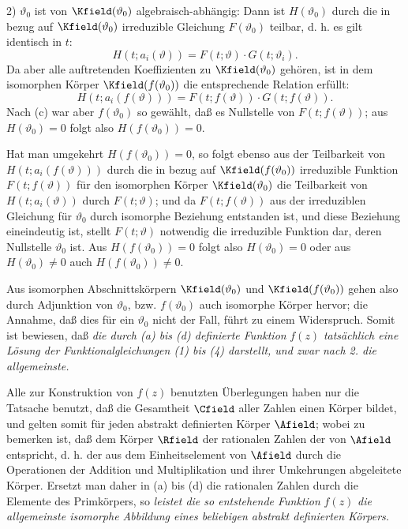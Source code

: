\documentclass[11pt]{article}
\begin{document}
2) \(\vartheta_0\) ist von \(\Kfield(\vartheta_0)\) algebraisch-abhängig: Dann ist \(H(\vartheta_0)\) durch die in bezug auf \(\Kfield(\vartheta_0)\) irreduzible Gleichung \(F(\vartheta_0)\) teilbar, d. h. es gilt identisch in \(t\):
\[
H(t;a_i(\vartheta))=F(t;\vartheta)\cdot G(t;\vartheta_i).
\]
Da aber alle auftretenden Koeffizienten zu \(\Kfield(\vartheta_0)\) gehören, ist in dem isomorphen Körper \(\Kfield(f(\vartheta_0))\) die entsprechende Relation erfüllt:
\[
H(t;a_i(f(\vartheta)))=F(t;f(\vartheta))\cdot G(t;f(\vartheta)).
\]
Nach (c) war aber \(f(\vartheta_0)\) so gewählt, daß es Nullstelle von \(F(t;f(\vartheta))\); aus \(H(\vartheta_0)=0\) folgt also \(H(f(\vartheta_0))=0\).

Hat man umgekehrt \(H(f(\vartheta_0))=0\), so folgt ebenso aus der Teilbarkeit von \(H(t;a_i(f(\vartheta)))\) durch die in bezug auf \(\Kfield(f(\vartheta_0))\) irreduzible Funktion \(F(t;f(\vartheta))\) für den isomorphen Körper \(\Kfield(\vartheta_0)\) die Teilbarkeit von \(H(t;a_i(\vartheta))\) durch \(F(t;\vartheta)\); und da \(F(t;f(\vartheta))\) aus der irreduziblen Gleichung für \(\vartheta_0\) durch isomorphe Beziehung entstanden ist, und diese Beziehung eineindeutig ist, stellt \(F(t;\vartheta)\) notwendig die irreduzible Funktion dar, deren Nullstelle \(\vartheta_0\) ist. Aus \(H(f(\vartheta_0))=0\) folgt also \(H(\vartheta_0)=0\) oder aus \(H(\vartheta_0)\ne0\) auch \(H(f(\vartheta_0))\ne0\).

Aus isomorphen Abschnittskörpern \(\Kfield(\vartheta_0)\) und \(\Kfield(f(\vartheta_0))\) gehen also durch Adjunktion von \(\vartheta_0\), bzw. \(f(\vartheta_0)\) auch isomorphe Körper hervor; die Annahme, daß dies für ein \(\vartheta_0\) nicht der Fall, führt zu einem Widerspruch. Somit ist bewiesen, daß \emph{die durch (a) bis (d) definierte Funktion} \(f(z)\) \emph{tatsächlich eine Lösung der Funktionalgleichungen (1) bis (4) darstellt, und zwar nach 2. die allgemeinste.}

Alle zur Konstruktion von \(f(z)\) benutzten Überlegungen haben nur die Tatsache benutzt, daß die Gesamtheit \(\Cfield\) aller Zahlen einen Körper bildet, und gelten somit für jeden abstrakt definierten Körper \(\Afield\); wobei zu bemerken ist, daß dem Körper \(\Rfield\) der rationalen Zahlen der  von \(\Afield\) entspricht, d. h. der aus dem Einheitselement von \(\Afield\) durch die Operationen der Addition und Multiplikation und ihrer Umkehrungen abgeleitete Körper. Ersetzt man daher in (a) bis (d) die rationalen Zahlen durch die Elemente des Primkörpers, so \emph{leistet die so entstehende Funktion} \(f(z)\) \emph{die allgemeinste isomorphe Abbildung eines beliebigen abstrakt definierten Körpers.}
\end{document}
